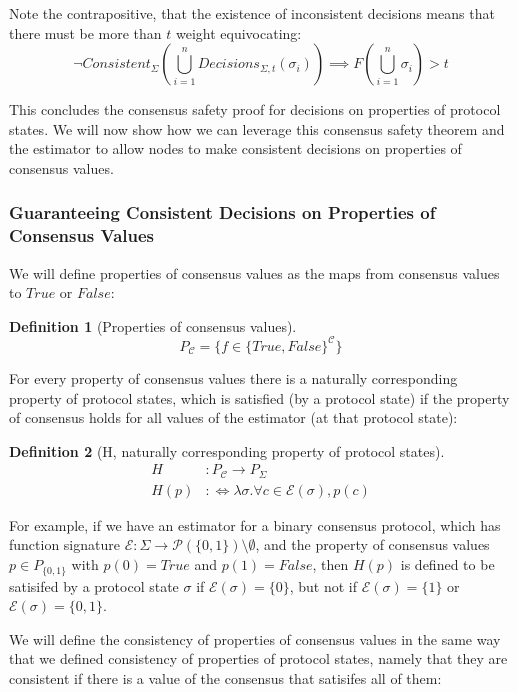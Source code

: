 \documentclass{article}
\theoremstyle{definition}
\newtheorem{defn}{Definition}[section]
\begin{document}
Note the contrapositive, that the existence of inconsistent decisions means that there must be more than $t$ weight equivocating:
$$
\neg Consistent_\Sigma(\bigcup_{i=1}^n Decisions_{\Sigma,t}(\sigma_i)) \implies F(\bigcup_{i=1}^n \sigma_i) > t
$$

This concludes the consensus safety proof for decisions on properties of protocol states. We will now show how we can leverage this consensus safety theorem and the estimator to allow nodes to make consistent decisions on properties of consensus values.

\subsubsection{Guaranteeing Consistent Decisions on Properties of Consensus Values}

We will define properties of consensus values as the maps from consensus values to $True$ or $False$:

\begin{defn}[Properties of consensus values]
$$
P_{\mathcal{C}} = \{ f \in \{True, False\}^\mathcal{C} \}
$$
\end{defn}

For every property of consensus values there is a naturally corresponding property of protocol states, which is satisfied (by a protocol state) if the property of consensus holds for all values of the estimator (at that protocol state):

\begin{defn}[H, naturally corresponding property of protocol states]
\begin{align}
H&: P_{\mathcal{C}}  \to P_\Sigma \\
H(p) &:\Leftrightarrow \lambda \sigma . \forall c \in \mathcal{E}(\sigma), p(c)
\end{align}
\end{defn}

For example, if we have an estimator for a binary consensus protocol, which has function signature $\mathcal{E}: \Sigma \to \mathcal{P}(\{0,1\})\setminus \emptyset$, and the property of consensus values $p \in P_{\{0, 1\}}$ with $p(0) = True$ and $p(1) = False$, then $H(p)$ is defined to be satisifed by a protocol state $\sigma$ if $\mathcal{E}(\sigma) = \{0\}$, but not if $\mathcal{E}(\sigma) = \{1\}$ or $\mathcal{E}(\sigma) = \{0, 1\}$.

We will define the consistency of properties of consensus values in the same way that we defined consistency of properties of protocol states, namely that they are consistent if there is a value of the consensus that satisifes all of them:
\end{document}
